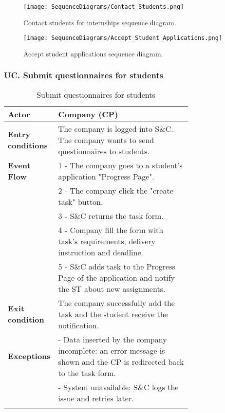 \begin{figure}[H]
    \begin{center}
        \texttt{[image: SequenceDiagrams/Contact\_Students.png]}
        \caption{Contact students for internships sequence diagram.}
        \label{fig:contact_students_for_internships_seqd}%
    \end{center}
\end{figure}

\begin{figure}[H]
    \begin{center}
        \texttt{[image: SequenceDiagrams/Accept\_Student\_Applications.png]}
        \caption{Accept student applications sequence diagram.}
        \label{fig:accept_student_applications_seqd}%
    \end{center}
\end{figure}

\subsubsection*{UC\cuc . Submit questionnaires for students}
\begin{center}
    \begin{longtable}{|l|p{0.75\linewidth}|}
        \hline
        \textbf{Actor}            & Company (CP)\\
        \hline
        \textbf{Entry conditions} & The company is logged into S\&C. The company wants to send questionnaires to students.\\
        \hline
        \textbf{Event Flow}     & 1 - The company goes to a student’s application "Progress Page". \\
                                & 2 - The company click the "create task" button. \\
                                & 3 - S\&C returns the task form.\\
                                & 4 - Company fill the form with task’s requirements, delivery instruction and deadline.\\
                                & 5 -  S\&C adds task to the Progress Page of the application and notify the ST about new assignments.\\
        \hline
        \textbf{Exit condition}     & The company successfully add the task and the student receive the notification.\\       
        \hline
        \textbf{Exceptions}     & - Data inserted by the company incomplete: an error message is shown and the CP is redirected back to the task form. \\
                                & - System unavailable: S\&C logs the issue and retries later. \\
        \hline
        \caption{Submit questionnaires for students}
        \label{tab: submit_questionnaires_for_students_usecase}
    \end{longtable}
\end{center}

